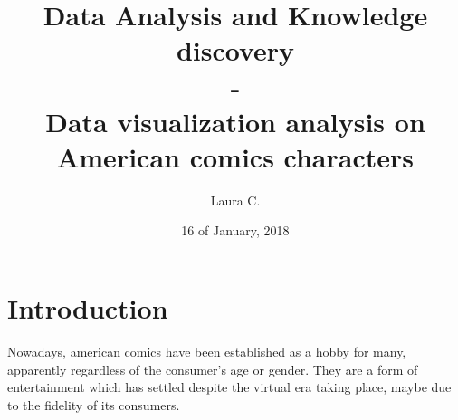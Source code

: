 

\usepackage{bibentry}



\title{\textbf{{\Large Data Analysis and Knowledge discovery} \\ - \\ Data visualization analysis on American comics characters}}
\author{Laura C.}
\date{16 of January, 2018}



\maketitle

\tableofcontents

\newpage
\section{Introduction}
Nowadays, american comics have been established as a hobby for many, apparently regardless of the consumer's age or gender. They are a form of entertainment which has settled despite the virtual era taking place, maybe due to the fidelity of its consumers.


